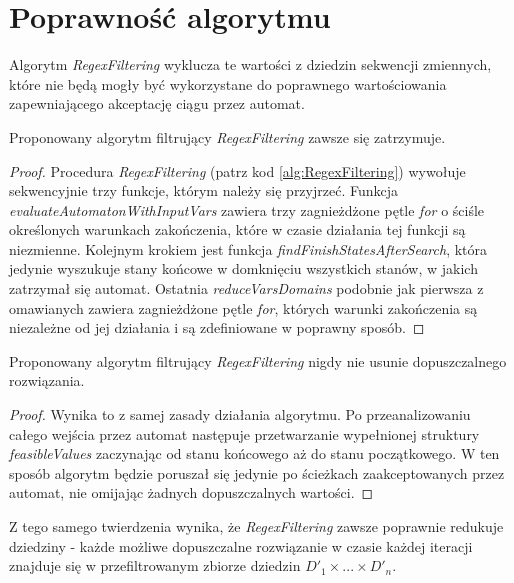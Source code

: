 \section{Poprawność algorytmu}
Algorytm \textit{RegexFiltering} wyklucza te wartości z dziedzin sekwencji zmiennych, które nie będą mogły być wykorzystane do 
poprawnego wartościowania zapewniającego akceptację ciągu przez automat. 
\begin{theorem}
Proponowany algorytm filtrujący \textit{RegexFiltering} zawsze się zatrzymuje.
\end{theorem}
\begin{proof}
Procedura \textit{RegexFiltering} (patrz kod \ref{alg:RegexFiltering}) wywołuje sekwencyjnie trzy funkcje, którym należy się przyjrzeć. Funkcja
\textit{evaluateAutomatonWithInputVars} zawiera trzy zagnieżdżone pętle \textit{for} o ściśle określonych warunkach zakończenia,
które w czasie działania tej funkcji są niezmienne. Kolejnym krokiem jest funkcja \textit{findFinishStatesAfterSearch}, która
jedynie wyszukuje stany końcowe w domknięciu wszystkich stanów, w jakich zatrzymał się automat. Ostatnia \textit{reduceVarsDomains}
podobnie jak pierwsza z omawianych zawiera zagnieżdżone pętle \textit{for}, których warunki zakończenia są niezależne od jej
działania i są zdefiniowane w poprawny sposób.
\end{proof}
\begin{theorem}
Proponowany algorytm filtrujący \textit{RegexFiltering} nigdy nie usunie dopuszczalnego rozwiązania.
\end{theorem}
\begin{proof}
Wynika to z samej zasady działania algorytmu. Po przeanalizowaniu całego wejścia przez automat następuje przetwarzanie
wypełnionej struktury \textit{feasibleValues} zaczynając od stanu końcowego aż do stanu początkowego.
W ten sposób algorytm będzie poruszał się jedynie po ścieżkach zaakceptowanych przez automat, nie omijając żadnych dopuszczalnych
wartości.
\end{proof}
\par
Z tego samego twierdzenia wynika, że \textit{RegexFiltering} zawsze poprawnie redukuje dziedziny - każde możliwe dopuszczalne
rozwiązanie w czasie każdej iteracji znajduje się w przefiltrowanym zbiorze dziedzin $D'_1 \times ... \times D'_n$.

